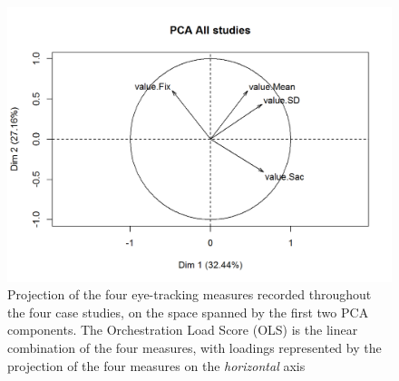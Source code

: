 \documentclass[10pt,journal,compsoc]{IEEEtran}
\begin{document}

\begin{figure}[!t]
\centering
\includegraphics[width=\linewidth]{img/PCA.png}
\caption{Projection of the four eye-tracking measures recorded throughout the four case studies, on the space spanned by the first two PCA components. The Orchestration Load Score (OLS) is the linear combination of the four measures, with loadings represented by the projection of the four measures on the \textit{horizontal} axis}
\label{fig:pca}
\end{figure}
\end{document}
